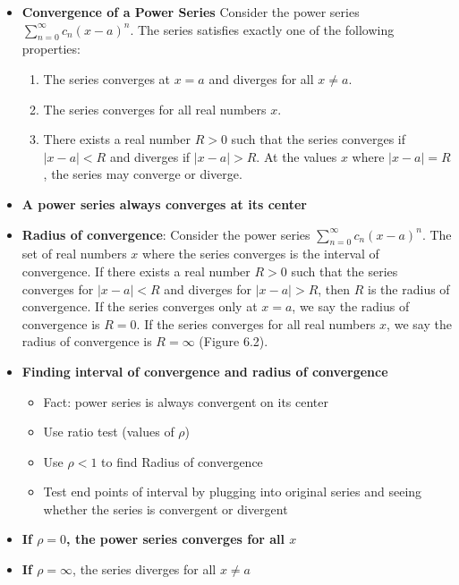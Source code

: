 \documentclass{report}
\begin{document}
\begin{itemize}
        \item \textbf{Convergence of a Power Series}
            \bigbreak \noindent 
            Consider the power series \(\sum_{n=0}^{\infty} c_n (x - a)^n\). The series satisfies exactly one of the following properties:
            \begin{enumerate}[label=(\roman*)]
                \item The series converges at \( x = a \) and diverges for all \( x \neq a \).
                \item The series converges for all real numbers \( x \).
                \item There exists a real number \( R > 0 \) such that the series converges if \( |x - a| < R \) and diverges if \( |x - a| > R \). At the values \( x \) where \( |x - a| = R \), the series may converge or diverge.
            \end{enumerate}
        \item \textbf{A power series always converges at its center}
        \item \textbf{Radius of convergence}:         Consider the power series \(\sum_{n=0}^{\infty} c_n (x - a)^n\). The set of real numbers \( x \) where the series converges is the interval of convergence. If there exists a real number \( R > 0 \) such that the series converges for \( |x - a| < R \) and diverges for \( |x - a| > R \), then \( R \) is the radius of convergence. If the series converges only at \( x = a \), we say the radius of convergence is \( R = 0 \). If the series converges for all real numbers \( x \), we say the radius of convergence is \( R = \infty \) (Figure 6.2).
        \item \textbf{Finding interval of convergence and radius of convergence}
            \begin{itemize}
                \item Fact: power series is always convergent on its center
                \item Use ratio test (values of $\rho$) 
                \item Use $\rho < 1$ to find Radius of convergence
                \item Test end points of interval by plugging into original series and seeing whether the series is convergent or divergent
            \end{itemize}
        \item \textbf{If $\rho = 0$, the power series converges for all $x$}
        \item \textbf{If $\rho = \infty$}, the series diverges for all $x \neq a$ 

\end{itemize}
\end{document}
